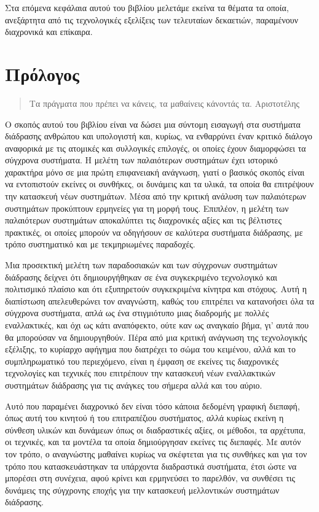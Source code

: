 \documentclass[
]{article}
\begin{document}
Στα επόμενα κεφάλαια αυτού του βιβλίου μελετάμε εκείνα τα θέματα τα
οποία, ανεξάρτητα από τις τεχνολογικές εξελίξεις των τελευταίων
δεκαετιών, παραμένουν διαχρονικά και επίκαιρα.

\hypertarget{ux3c0ux3c1ux3ccux3bbux3bfux3b3ux3bfux3c2}{%
\section{Πρόλογος}\label{ux3c0ux3c1ux3ccux3bbux3bfux3b3ux3bfux3c2}}

\begin{quote}
Τα πράγματα που πρέπει να κάνεις, τα μαθαίνεις κάνοντάς τα. Αριστοτέλης
\end{quote}

Ο σκοπός αυτού του βιβλίου είναι να δώσει μια σύντομη εισαγωγή στα
συστήματα διάδρασης ανθρώπου και υπολογιστή και, κυρίως, να ενθαρρύνει
έναν κριτικό διάλογο αναφορικά με τις ατομικές και συλλογικές επιλογές,
οι οποίες έχουν διαμορφώσει τα σύγχρονα συστήματα. Η μελέτη των
παλαιότερων συστημάτων έχει ιστορικό χαρακτήρα μόνο σε μια πρώτη
επιφανειακή ανάγνωση, γιατί ο βασικός σκοπός είναι να εντοπιστούν
εκείνες οι συνθήκες, οι δυνάμεις και τα υλικά, τα οποία θα επιτρέψουν
την κατασκευή νέων συστημάτων. Μέσα από την κριτική ανάλυση των
παλαιότερων συστημάτων προκύπτουν ερμηνείες για τη μορφή τους. Επιπλέον,
η μελέτη των παλαιότερων συστημάτων αποκαλύπτει τις διαχρονικές αξίες
και τις βέλτιστες πρακτικές, οι οποίες μπορούν να οδηγήσουν σε καλύτερα
συστήματα διάδρασης, με τρόπο συστηματικό και με τεκμηριωμένες
παραδοχές.

Μια προσεκτική μελέτη των παραδοσιακών και των σύγχρονων συστημάτων
διάδρασης δείχνει ότι δημιουργήθηκαν σε ένα συγκεκριμένο τεχνολογικό και
πολιτισμικό πλαίσιο και ότι εξυπηρετούν συγκεκριμένα κίνητρα και
στόχους. Αυτή η διαπίστωση απελευθερώνει τον αναγνώστη, καθώς του
επιτρέπει να κατανοήσει όλα τα σύγχρονα συστήματα, απλά ως ένα
στιγμιότυπο μιας διαδρομής με πολλές εναλλακτικές, και όχι ως κάτι
αναπόφεκτο, ούτε καν ως αναγκαίο βήμα, γι' αυτά που θα μπορούσαν να
δημιουργηθούν. Πέρα από μια κριτική ανάγνωση της τεχνολογικής εξέλιξης,
το κυρίαρχο αφήγημα που διατρέχει το σώμα του κειμένου, αλλά και το
συμπληρωματικό του περιεχόμενο, είναι η έμφαση σε εκείνες τις
διαχρονικές τεχνολογίες και τεχνικές που επιτρέπουν την κατασκευή νέων
εναλλακτικών συστημάτων διάδρασης για τις ανάγκες του σήμερα αλλά και
του αύριο.

Αυτό που παραμένει διαχρονικό δεν είναι τόσο κάποια δεδομένη γραφική
διεπαφή, όπως αυτή του κινητού ή του επιτραπέζιου συστήματος, αλλά
κυρίως εκείνη η σύνθεση υλικών και δυνάμεων όπως οι διαδραστικές αξίες,
οι μέθοδοι, τα αρχέτυπα, οι τεχνικές, και τα μοντέλα τα οποία
δημιούργησαν εκείνες τις διεπαφές. Με αυτόν τον τρόπο, ο αναγνώστης
μαθαίνει κυρίως να σκέφτεται για τις συνθήκες και για τον τρόπο που
κατασκευάστηκαν τα υπάρχοντα διαδραστικά συστήματα, έτσι ώστε να
μπορέσει στη συνέχεια, αφού κρίνει και ερμηνεύσει το παρελθόν, να
συνθέσει τις δυνάμεις της σύγχρονης εποχής για την κατασκευή μελλοντικών
συστημάτων διάδρασης.
\end{document}
